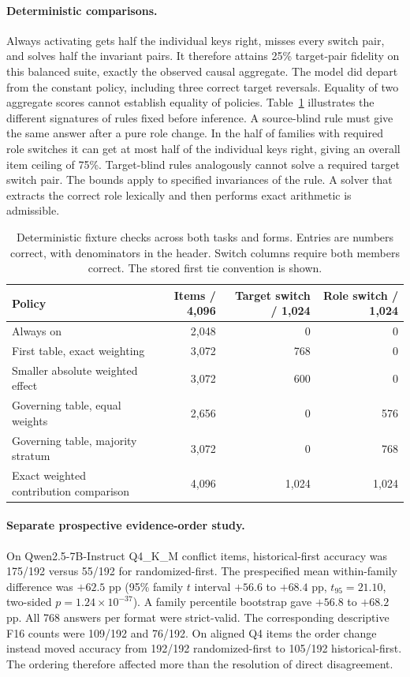 \paragraph{Deterministic comparisons.}
Always activating gets half the individual keys right, misses every switch pair, and solves half the invariant pairs. It therefore attains 25\% target-pair fidelity on this balanced suite, exactly the observed causal aggregate. The model did depart from the constant policy, including three correct target reversals. Equality of two aggregate scores cannot establish equality of policies. Table~\ref{tab:policies} illustrates the different signatures of rules fixed before inference. A source-blind rule must give the same answer after a pure role change. In the half of families with required role switches it can get at most half of the individual keys right, giving an overall item ceiling of 75\%. Target-blind rules analogously cannot solve a required target switch pair. The bounds apply to specified invariances of the rule. A solver that extracts the correct role lexically and then performs exact arithmetic is admissible.
\begin{table}[t]\centering\small\caption{Deterministic fixture checks across both tasks and forms. Entries are numbers correct, with denominators in the header. Switch columns require both members correct. The stored first tie convention is shown.}\label{tab:policies}
\begin{tabular}{@{}lrrr@{}}\toprule
Policy & Items / 4,096 & Target switch / 1,024 & Role switch / 1,024\\\midrule
Always on &2,048&0&0\\
First table, exact weighting &3,072&768&0\\
Smaller absolute weighted effect &3,072&600&0\\
Governing table, equal weights &2,656&0&576\\
Governing table, majority stratum &3,072&0&768\\
Exact weighted contribution comparison &4,096&1,024&1,024\\\bottomrule
\end{tabular}\end{table}

\paragraph{Separate prospective evidence-order study.}
On Qwen2.5-7B-Instruct Q4\_K\_M conflict items, historical-first accuracy was 175/192 versus 55/192 for randomized-first. The prespecified mean within-family difference was $+62.5$ pp (95\% family $t$ interval $+56.6$ to $+68.4$ pp, $t_{95}=21.10$, two-sided $p=1.24\times10^{-37}$). A family percentile bootstrap gave $+56.8$ to $+68.2$ pp. All 768 answers per format were strict-valid. The corresponding descriptive F16 counts were 109/192 and 76/192. On aligned Q4 items the order change instead moved accuracy from 192/192 randomized-first to 105/192 historical-first. The ordering therefore affected more than the resolution of direct disagreement.

